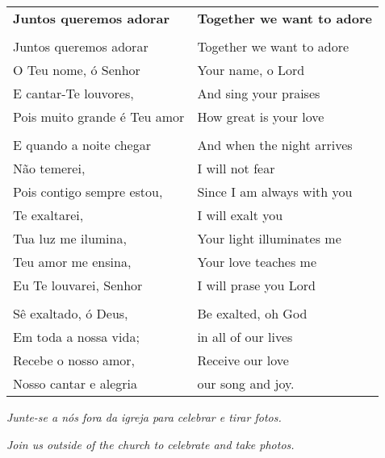 \begin{longtable}{L{1.7in}R{1.7in}}
  {\bf Juntos queremos adorar}& {\bf Together we want to adore}\\
                        &\\
  Juntos queremos adorar& Together we want to adore\\
  O Teu nome, ó Senhor& Your name, o Lord\\
  E cantar-Te louvores, & And sing your praises\\
  Pois muito grande é Teu amor & How great is your love\\
                                &\\
  E quando a noite chegar & And when the night arrives\\
  Não temerei,  & I will not fear\\
  Pois contigo sempre estou, & Since I am always with you\\
  Te exaltarei, & I will exalt you \\
  Tua luz me ilumina, & Your light illuminates me\\
  Teu amor me ensina, & Your love teaches me \\
  Eu Te louvarei, Senhor & I will prase you Lord\\
                         &\\
  Sê exaltado, ó Deus, & Be exalted, oh God\\
  Em toda a nossa vida; & in all of our lives\\
  Recebe o nosso amor, & Receive our love \\
  Nosso cantar e alegria & our song and joy. \\
\end{longtable}


{\it Junte-se a nós fora da igreja para celebrar e tirar fotos.}

{\it Join us outside of the church to celebrate and take photos.}
